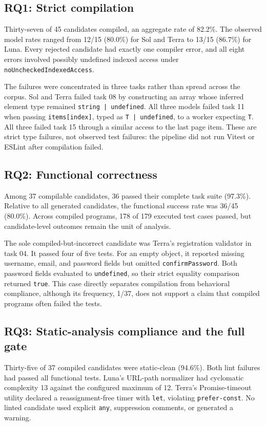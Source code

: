 \documentclass[conference]{IEEEtran}
\begin{document}
\subsection{RQ1: Strict compilation}
Thirty-seven of 45 candidates compiled, an aggregate rate of 82.2\%. The observed model rates ranged from 12/15 (80.0\%) for Sol and Terra to 13/15 (86.7\%) for Luna. Every rejected candidate had exactly one compiler error, and all eight errors involved possibly undefined indexed access under \texttt{noUncheckedIndexedAccess}.

The failures were concentrated in three tasks rather than spread across the corpus. Sol and Terra failed task 08 by constructing an array whose inferred element type remained \texttt{string | undefined}. All three models failed task 11 when passing \texttt{items[index]}, typed as \texttt{T | undefined}, to a worker expecting \texttt{T}. All three failed task 15 through a similar access to the last page item. These are strict type failures, not observed test failures: the pipeline did not run Vitest or ESLint after compilation failed.

\subsection{RQ2: Functional correctness}
Among 37 compilable candidates, 36 passed their complete task suite (97.3\%). Relative to all generated candidates, the functional success rate was 36/45 (80.0\%). Across compiled programs, 178 of 179 executed test cases passed, but candidate-level outcomes remain the unit of analysis.

The sole compiled-but-incorrect candidate was Terra's registration validator in task 04. It passed four of five tests. For an empty object, it reported missing username, email, and password fields but omitted \texttt{confirmPassword}. Both password fields evaluated to \texttt{undefined}, so their strict equality comparison returned \texttt{true}. This case directly separates compilation from behavioral compliance, although its frequency, 1/37, does not support a claim that compiled programs often failed the tests.

\subsection{RQ3: Static-analysis compliance and the full gate}
Thirty-five of 37 compiled candidates were static-clean (94.6\%). Both lint failures had passed all functional tests. Luna's URL-path normalizer had cyclomatic complexity 13 against the configured maximum of 12. Terra's Promise-timeout utility declared a reassignment-free timer with \texttt{let}, violating \texttt{prefer-const}. No linted candidate used explicit \texttt{any}, suppression comments, or generated a warning.
\end{document}
